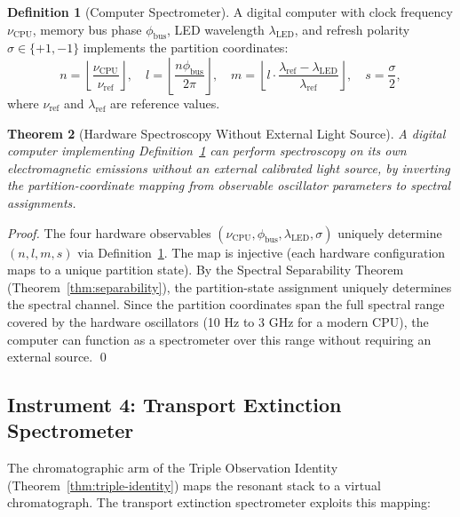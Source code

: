\documentclass[11pt,twocolumn,a4paper]{article}
\theoremstyle{plain}
\newtheorem{theorem}{Theorem}[section]
\theoremstyle{definition}
\newtheorem{definition}[theorem]{Definition}
\theoremstyle{remark}
\begin{document}
\begin{definition}[Computer Spectrometer]
\label{def:computer-spectrometer}
A digital computer with clock frequency $\nu_\text{CPU}$, memory bus phase $\phi_\text{bus}$, LED wavelength $\lambda_\text{LED}$, and refresh polarity $\sigma\in\{+1,-1\}$ implements the partition coordinates:
\begin{equation}
  n = \left\lfloor\frac{\nu_\text{CPU}}{\nu_\text{ref}}\right\rfloor, \quad l = \left\lfloor\frac{n\phi_\text{bus}}{2\pi}\right\rfloor, \quad m = \left\lfloor l\cdot\frac{\lambda_\text{ref}-\lambda_\text{LED}}{\lambda_\text{ref}}\right\rfloor, \quad s = \frac{\sigma}{2},
\end{equation}
where $\nu_\text{ref}$ and $\lambda_\text{ref}$ are reference values.
\end{definition}

\begin{theorem}[Hardware Spectroscopy Without External Light Source]
\label{thm:hardware-spectroscopy}
A digital computer implementing Definition~\ref{def:computer-spectrometer} can perform spectroscopy on its own electromagnetic emissions without an external calibrated light source, by inverting the partition-coordinate mapping from observable oscillator parameters to spectral assignments.
\end{theorem}

\begin{proof}
The four hardware observables $(\nu_\text{CPU},\phi_\text{bus},\lambda_\text{LED},\sigma)$ uniquely determine $(n,l,m,s)$ via Definition~\ref{def:computer-spectrometer}. The map is injective (each hardware configuration maps to a unique partition state). By the Spectral Separability Theorem (Theorem~\ref{thm:separability}), the partition-state assignment uniquely determines the spectral channel. Since the partition coordinates span the full spectral range covered by the hardware oscillators (10 Hz to 3 GHz for a modern CPU), the computer can function as a spectrometer over this range without requiring an external source. \qed
\end{proof}

\subsection{Instrument 4: Transport Extinction Spectrometer}
\label{sec:transport-extinction}

The chromatographic arm of the Triple Observation Identity (Theorem~\ref{thm:triple-identity}) maps the resonant stack to a virtual chromatograph. The transport extinction spectrometer exploits this mapping:
\end{document}
